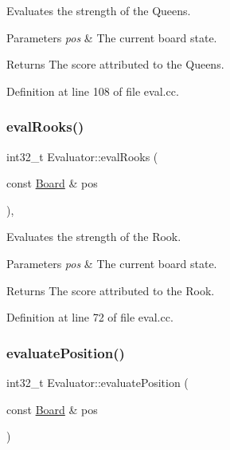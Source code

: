 Evaluates the strength of the Queens. 


\begin{DoxyParams}{Parameters}
{\em pos} & The current board state. \\
\hline
\end{DoxyParams}
\begin{DoxyReturn}{Returns}
The score attributed to the Queens. 
\end{DoxyReturn}


Definition at line 108 of file eval.\+cc.

\mbox{\label{classEvaluator_ac1cfc6e10fcd71fc4148415d889a4085}} 
\subsubsection{\texorpdfstring{eval\+Rooks()}{evalRooks()}}
{\footnotesize\ttfamily int32\+\_\+t Evaluator\+::eval\+Rooks (\begin{DoxyParamCaption}\item[{const \mbox{\hyperlink{classBoard}{Board}} \&}]{pos }\end{DoxyParamCaption})\hspace{0.3cm}{\ttfamily [private]}, {\ttfamily [noexcept]}}



Evaluates the strength of the Rook. 


\begin{DoxyParams}{Parameters}
{\em pos} & The current board state. \\
\hline
\end{DoxyParams}
\begin{DoxyReturn}{Returns}
The score attributed to the Rook. 
\end{DoxyReturn}


Definition at line 72 of file eval.\+cc.

\mbox{\label{classEvaluator_a82ac01bb85da704f7a9f1a059c0e91fb}} 
\subsubsection{\texorpdfstring{evaluate\+Position()}{evaluatePosition()}}
{\footnotesize\ttfamily int32\+\_\+t Evaluator\+::evaluate\+Position (\begin{DoxyParamCaption}\item[{const \mbox{\hyperlink{classBoard}{Board}} \&}]{pos }\end{DoxyParamCaption})\hspace{0.3cm}{\ttfamily [noexcept]}}



